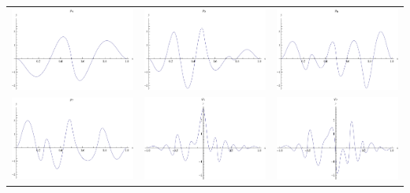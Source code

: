 \documentclass{article}
\begin{document}
\begin{landscape}
\begin{tabular}{ccc}
\includegraphics[width=6.7cm]{biquadratic_bspline_4.pdf}& \includegraphics[width=6.7cm]{biquadratic_bspline_5.pdf}& \includegraphics[width=6.7cm]{biquadratic_bspline_6.pdf} \\
\includegraphics[width=6.7cm]{biquadratic_bspline_7.pdf}& \includegraphics[width=6.7cm]{biquadratic_bspline_8.pdf}& \includegraphics[width=6.7cm]{biquadratic_bspline_9.pdf} \\
\end{tabular} 
 \end{landscape}
\end{document}
